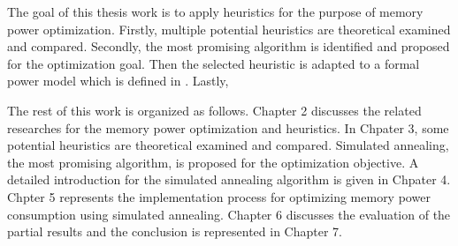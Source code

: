 	The goal of this thesis work is to apply heuristics for the purpose of memory power optimization. Firstly, multiple potential
	heuristics are theoretical examined and compared. Secondly, the most promising algorithm is identified and proposed for the
	optimization goal. Then the selected heuristic is adapted to a formal power model which is defined in \cite{Strobel2016}.
	Lastly,  
	
	
	
	
	The rest of this work is organized as follows.
	Chapter 2 discusses the related researches for the memory power optimization and heuristics. In Chpater 3, some potential
	heuristics are theoretical examined and compared. Simulated annealing, the most promising algorithm, is proposed for the 
	optimization objective. A detailed introduction for the simulated annealing algorithm is given in Chpater 4. Chpter 5 represents
	the implementation process for optimizing memory power consumption using simulated annealing. Chapter 6 discusses the evaluation
	of the partial results and the conclusion is represented in Chapter 7.


